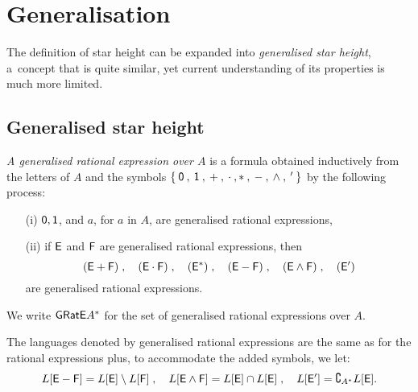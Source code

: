 \chapter{Generalisation}

The definition of star height can be expanded into \emph{generalised star height}, a~concept that is quite similar, yet current understanding of its properties is much more limited.

\section{Generalised star height}

\begin{defn}
    \emph{A generalised rational expression over $A$} is a formula obtained inductively from the letters of $A$ and the symbols $\{ \: {\mathsf{0}} \: , \: {\mathsf{1}} \: , \: + \: , \: \cdot \: , * \: , \: - \: , \: \wedge \: , \: ^{\prime} \: \}$ by the following process:
    \begin{itemize}
        \item[(i)] ${\mathsf{0}}, {\mathsf{1}}$, and $a$, for $a$ in $A$, are generalised rational expressions,
        \item[(ii)] if ${\mathsf{E}}$ and ${\mathsf{F}}$ are generalised rational expressions, then
            \[
                ({\mathsf{E}} + {\mathsf{F}}) \; , \quad ({\mathsf{E}} \cdot {\mathsf{F}}) \; , \quad ({\mathsf{E}}^*) \; , \quad ({\mathsf{E}} - {\mathsf{F}}) \; , \quad ({\mathsf{E}} \wedge {\mathsf{F}}) \; , \quad ({\mathsf{E}}^{\prime})
            \]
             are generalised rational expressions.
    \end{itemize}
    We write ${\mathsf{GRatE}} A^*$ for the set of generalised rational expressions over $A$.
\end{defn}

The languages denoted by generalised rational expressions are the same as for the rational expressions plus, to accommodate the added symbols, we let:
\[
    L[{\mathsf{E}} - {\mathsf{F}}] = L[{\mathsf{E}}] \setminus L[{\mathsf{F}}] \; , \quad L[{\mathsf{E}} \wedge {\mathsf{F}}] = L[{\mathsf{E}}] \cap L[{\mathsf{E}}] \; , \quad L[{\mathsf{E}}^{\prime}] = \complement_{A^*} L[{\mathsf{E}}].
\]

